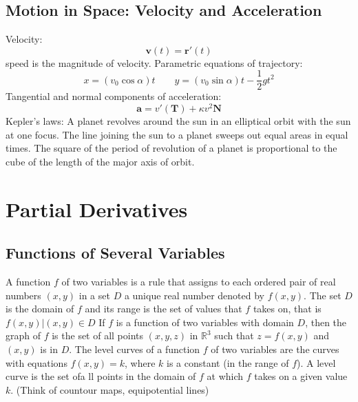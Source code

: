 \documentclass{article}
\begin{document}
    \begin{multicols}{2}
    \subsection{Motion in Space: Velocity and Acceleration}
    \begin{outline}
        \1 Velocity: \[\mathbf v(t)=\mathbf r'(t)\]
        \1 speed is the magnitude of velocity. 
        \1 Parametric equations of trajectory: \[x=(v_0\cos\alpha)t\qquad y=(v_0\sin\alpha)t-\frac{1}{2}gt^2\]
        \1 Tangential and normal components of acceleration: \[\mathbf a=v'(\mathbf T)+\kappa v^2\mathbf N\]
        \1 Kepler's laws: 
            \2 A planet revolves around the sun in an elliptical orbit with the sun at one focus. 
            \2 The line joining the sun to a planet sweeps out equal areas in equal times. 
            \2 The square of the period of revolution of a planet is proportional to the cube of the length of the major axis of orbit. 
    \end{outline}

    \section{Partial Derivatives} %
    \subsection{Functions of Several Variables} %
    \begin{outline}
        \1 A function $f$ of two variables is a rule that assigns to each ordered pair of real numbers \((x,y)\) in a set $D$ a unique real number denoted by \(f(x,y)\). The set $D$ is the domain of $f$ and its range is the set of values that $f$ takes on, that is \({f(x,y)|(x,y)\in D}\)
        \1 If $f$ is a function of two variables with domain $D$, then the graph of $f$ is the set of all points \((x,y,z)\) in \(\mathbb{R}^3\) such that \(z=f(x,y)\) and \((x,y)\) is in $D$. 
        \1 The level curves of a function $f$ of two variables are the curves with equations \(f(x,y)=k\), where $k$ is a constant (in the range of $f$). 
            \2 A level curve is the set ofa ll points in the domain of $f$ at which $f$ takes on a given value $k$. (Think of countour maps, equipotential lines)


    \end{outline}\end{multicols}
\end{document}
